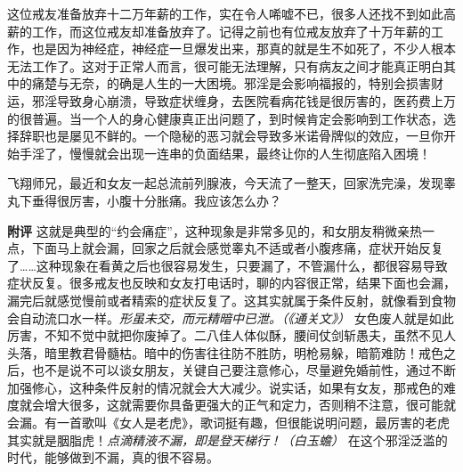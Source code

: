 \begin{case}
    这位戒友准备放弃十二万年薪的工作，实在令人唏嘘不已，很多人还找不到如此高薪的工作，而这位戒友却准备放弃了。记得之前也有位戒友放弃了十万年薪的工作，也是因为神经症，神经症一旦爆发出来，那真的就是生不如死了，不少人根本无法工作了。这对于正常人而言，很可能无法理解，只有病友之间才能真正明白其中的痛楚与无奈，的确是人生的一大困境。邪淫是会影响福报的，特别会损害财运，邪淫导致身心崩溃，导致症状缠身，去医院看病花钱是很厉害的，医药费上万的很普遍。当一个人的身心健康真正出问题了，到时候肯定会影响到工作状态，选择辞职也是屡见不鲜的。一个隐秘的恶习就会导致多米诺骨牌似的效应，一旦你开始手淫了，慢慢就会出现一连串的负面结果，最终让你的人生彻底陷入困境！
\end{case}

\begin{case}
    飞翔师兄，最近和女友一起总流前列腺液，今天流了一整天，回家洗完澡，发现睾丸下垂得很厉害，小腹十分胀痛。我应该怎么办？

    \textbf{附评} 这就是典型的“约会痛症”，这种现象是非常多见的，和女朋友稍微亲热一点，下面马上就会漏，回家之后就会感觉睾丸不适或者小腹疼痛，症状开始反复了……这种现象在看黄之后也很容易发生，只要漏了，不管漏什么，都很容易导致症状反复。很多戒友也反映和女友打电话时，聊的内容很正常，结果下面也会漏，漏完后就感觉慢前或者精索的症状反复了。这其实就属于条件反射，就像看到食物会自动流口水一样。\textit{形虽未交，而元精暗中已泄。（《通关文》）} 女色废人就是如此厉害，不知不觉中就把你废掉了。二八佳人体似酥，腰间仗剑斩愚夫，虽然不见人头落，暗里教君骨髓枯。暗中的伤害往往防不胜防，明枪易躲，暗箭难防！戒色之后，也不是说不可以谈女朋友，关键自己要注意修心，尽量避免婚前性，通过不断加强修心，这种条件反射的情况就会大大减少。说实话，如果有女友，那戒色的难度就会增大很多，这就需要你具备更强大的正气和定力，否则稍不注意，很可能就会漏。有一首歌叫《女人是老虎》，歌词挺有趣，但很能说明问题，最厉害的老虎其实就是胭脂虎！\textit{点滴精液不漏，即是登天梯行！（白玉蟾）} 在这个邪淫泛滥的时代，能够做到不漏，真的很不容易。
\end{case}

